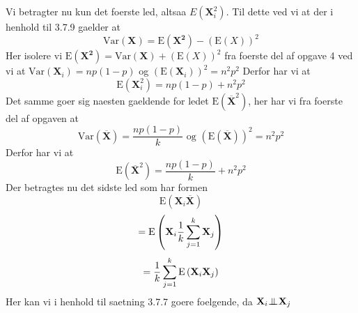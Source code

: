 \documentclass[a4paper,11pt]{article}
\begin{document}
Vi betragter nu kun det foerste led, altsaa $E(\mathbf{X}_i^2)$. Til dette ved vi at der i henhold til 3.7.9 gaelder at
\[
\textrm{Var}\left(\mathbf{X}\right) = \textrm{E}\left( \mathbf{X^2} \right) - \left( \textrm{E} \left( X \right) \right)^2
\]
Her isolere vi $\textrm{E}\left( \mathbf{X^2} \right) = \textrm{Var}\left(\mathbf{X}\right) + \left( \textrm{E} \left( X \right) \right)^2$ fra foerste del af opgave 4 ved vi at $\textrm{Var}\left( \mathbf{X}_i \right) = np(1-p)$ og $\left(\textrm{E}\left(\mathbf{X}_i\right)\right)^2 = n^2p^2$
Derfor har vi at
\[
\textrm{E}\left( \mathbf{X}_{i}^{2} \right) = np(1-p) + n^2p^2
\]
Det samme goer sig naesten gaeldende for ledet $\textrm{E}\left(\mathbf{\overline{X}}^{2} \right)$, her har vi fra foerste del af opgaven at
\[
\textrm{Var}\left(\mathbf{\overline{X}} \right) = \frac{np(1-p)}{k} \textrm{ og } \left(\textrm{E}\left(\mathbf{\overline{X}}\right)\right)^2 = n^2p^2
\]
Derfor har vi at
\[
\textrm{E}\left(\mathbf{\overline{X}}^{2} \right) = \frac{np(1-p)}{k} + n^2p^2
\]
Der betragtes nu det sidste led som har formen
\[
\textrm{E}\left( \mathbf{X}_i \mathbf{\overline{X}}\right)
\]
\[
= \textrm{E}\left( \mathbf{X}_i \frac{1}{k} \sum_{j = 1}^{k} \mathbf{X}_j \right)
\]
\[
= \frac{1}{k} \sum_{j = 1}^{k} \textrm{E}\left( \mathbf{X}_i \mathbf{X}_j \right)
\]
Her kan vi i henhold til saetning 3.7.7 goere foelgende, da $\mathbf{X}_i {\;\bot\!\!\!\!\!\!\bot\;} \mathbf{X}_j$
\end{document}
